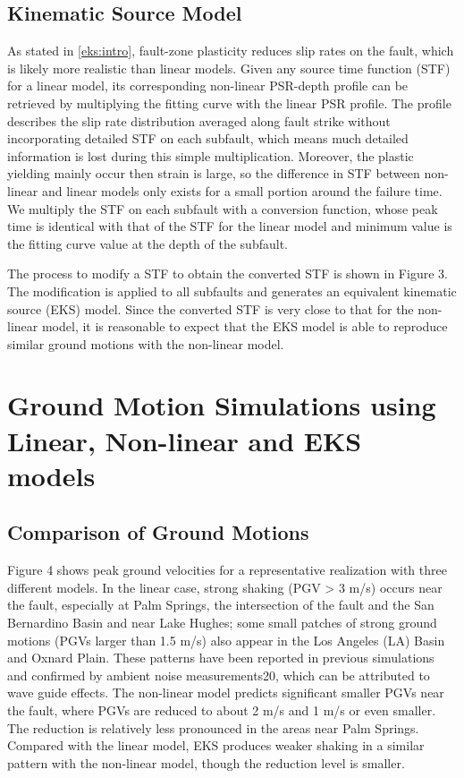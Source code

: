 \subsection{Kinematic Source Model}
As stated in \cref{eks:intro}, fault-zone plasticity reduces slip rates on the fault, which is likely more realistic than linear models. Given any source time function (STF) for a linear model, its corresponding non-linear PSR-depth profile can be retrieved by multiplying the fitting curve with the linear PSR profile. The profile describes the slip rate distribution averaged along fault strike without incorporating detailed STF on each subfault, which means much detailed information is lost during this simple multiplication. Moreover, the plastic yielding mainly occur then strain is large, so the difference in STF between non-linear and linear models only exists for a small portion around the failure time. We multiply the STF on each subfault with a conversion function, whose peak time is identical with that of the STF for the linear model and minimum value is the fitting curve value at the depth of the subfault.

The process to modify a STF to obtain the converted STF is shown in Figure 3. The modification is applied to all subfaults and generates an equivalent kinematic source (EKS) model. Since the converted STF is very close to that for the non-linear model, it is reasonable to expect that the EKS model is able to reproduce similar ground motions with the non-linear model.

\section{Ground Motion Simulations using Linear, Non-linear and EKS models}

\subsection{Comparison of Ground Motions}
Figure 4 shows peak ground velocities for a representative realization with three different models. In the linear case, strong shaking (PGV > 3 m/s) occurs near the fault, especially at Palm Springs, the intersection of the fault and the San Bernardino Basin and near Lake Hughes; some small patches of strong ground motions (PGVs larger than 1.5 m/s) also appear in the Los Angeles (LA) Basin and Oxnard Plain. These patterns have been reported in previous simulations \citep{olsen2009shakeout} and confirmed by ambient noise measurements20, which can be attributed to wave guide effects. The non-linear model predicts significant smaller PGVs near the fault, where PGVs are reduced to about 2 m/s and 1 m/s or even smaller. The reduction is relatively less pronounced in the areas near Palm Springs. Compared with the linear model, EKS produces weaker shaking in a similar pattern with the non-linear model, though the reduction level is smaller.

